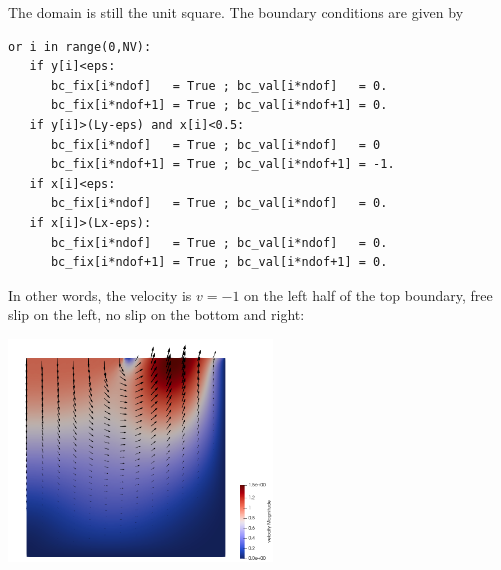 The domain is still the unit square. The boundary conditions are given by
\begin{lstlisting}
or i in range(0,NV):
   if y[i]<eps:
      bc_fix[i*ndof]   = True ; bc_val[i*ndof]   = 0.
      bc_fix[i*ndof+1] = True ; bc_val[i*ndof+1] = 0.
   if y[i]>(Ly-eps) and x[i]<0.5:
      bc_fix[i*ndof]   = True ; bc_val[i*ndof]   = 0
      bc_fix[i*ndof+1] = True ; bc_val[i*ndof+1] = -1.
   if x[i]<eps:
      bc_fix[i*ndof]   = True ; bc_val[i*ndof]   = 0.
   if x[i]>(Lx-eps):
      bc_fix[i*ndof]   = True ; bc_val[i*ndof]   = 0.
      bc_fix[i*ndof+1] = True ; bc_val[i*ndof+1] = 0.
\end{lstlisting}
In other words, the velocity is $v=-1$ on the left half of the top boundary, 
free slip on the left, no slip on the bottom and right:
\begin{center}
\includegraphics[width=7cm]{python_codes/fieldstone_12/results/punch/vel}
\end{center}





